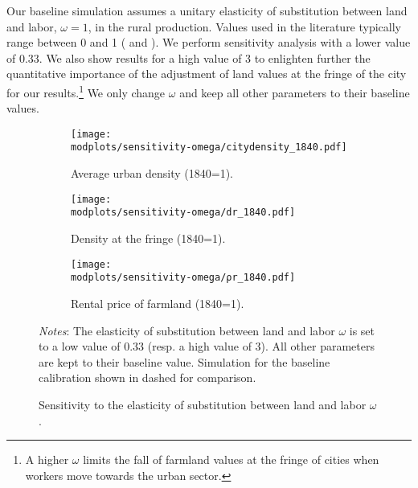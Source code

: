 \documentclass[11pt]{report}
\newcommand{\round}{revision3}  %
\newcommand{\modplots}{../../output/model/plots/\round}
\newcommand{\pthree}{0.37}  %
\begin{document}
Our baseline simulation assumes a unitary elasticity of substitution between land and labor, $\omega=1$, in the rural production. Values used in the literature typically range between 0 and 1 (\cite{bustosetal2016} and \cite{leukhinaturnovsky2016}). We perform sensitivity analysis with a lower value of 0.33. We also show results for a high value of 3 to enlighten further the quantitative importance of the adjustment of land values at the fringe of the city for our results.\footnote{A higher $\omega$ limits the fall of farmland values at the fringe of cities when workers move towards the urban sector.} We only change $\omega$ and keep all other parameters to their baseline values.


\begin{figure}[h!]
	\begin{adjustbox}{center}
		\begin{subfigure}{\pthree\textwidth}
			\texttt{[image: \\modplots/sensitivity-omega/citydensity\_1840.pdf]}
			\caption{Average urban density (1840=1).\label{B-fig:model-sensi-omega-avgd}}
		\end{subfigure}
		\begin{subfigure}{\pthree\textwidth}
			\texttt{[image: \\modplots/sensitivity-omega/dr\_1840.pdf]}
			\caption{Density at the fringe (1840=1).\label{B-fig:model-sensi-omega-dr}}
		\end{subfigure}
		\begin{subfigure}{\pthree\textwidth}
			\texttt{[image: \\modplots/sensitivity-omega/ρr\_1840.pdf]}
			\caption{Rental price of farmland (1840=1).\label{B-fig:model-sensi-omega-rhor}}
		\end{subfigure}
	\end{adjustbox}
	\caption{Sensitivity to the elasticity of substitution between land and labor $\omega$.\label{B-fig:model-sensi-omega}}
	{\footnotesize \textit{Notes}: The elasticity of substitution between land and labor $\omega$ is set to a low value of 0.33 (resp. a high value of 3). All other parameters are kept to their baseline value. Simulation for the baseline calibration shown in dashed for comparison.}
\end{figure}
\end{document}
